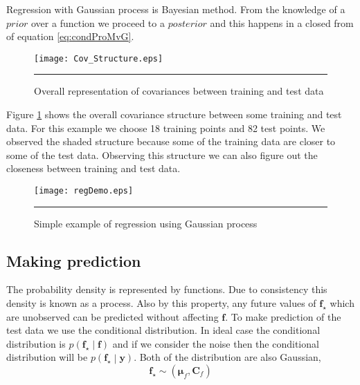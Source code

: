 Regression with Gaussian process is Bayesian method. From the knowledge of a $prior$ over a function we proceed to a
$posterior$ and this happens in a closed from of equation \ref{eq:condProMvG}. 

\begin{figure}[t]
	\centering
		\texttt{[image: Cov\_Structure.eps]}
		\rule{35em}{0.5pt}
	\caption[Overall representation of covariances between training and test data]
		{Overall representation of covariances between training and test data}
	\label{fig:Covariances_Structure}
\end{figure}

Figure \ref{fig:Covariances_Structure} shows the overall covariance structure between some training and test data.
For this example we choose 18 training points and 82 test points. We observed the shaded structure because some of
the training data are closer to some of the test data. Observing this structure we can also figure out the closeness
between training and test data. 

\begin{figure}
	\centering
		\texttt{[image: regDemo.eps]}
		\rule{35em}{0.5pt}
	\caption[Simple example of regression using Gaussian process]
		{Simple example of regression using Gaussian process}
	\label{fig:dempGPReg}
\end{figure}



\subsection{Making prediction}
The probability density is represented by functions. Due to consistency this density is known as a process. Also by this
property, any future values of $\mathbf{f_\star}$ which are unobserved can be predicted without affecting $\mathbf{f}$.
To make prediction of the test data we use the conditional distribution. In ideal case the conditional distribution
is $ p\left( \mathbf{f_\star} \middle| \mathbf{f} \right) $ and if we consider the noise then the conditional distribution
will be $ p\left( \mathbf{f_\star} \middle| \mathbf{y} \right) $. Both of the distribution are also Gaussian,
\begin{equation} \label{eq:prediction}
  \mathbf{f_\star}  \sim \left( \boldsymbol{\mu}_f, \mathbf{C}_f \right)
\end{equation}

